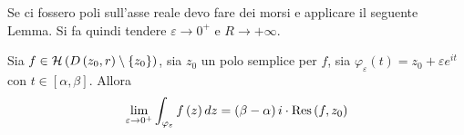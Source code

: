 Se ci fossero poli sull'asse reale devo fare dei morsi e applicare il seguente Lemma. Si fa quindi tendere $\varepsilon \rightarrow 0^{ + }$ e $R\rightarrow + \infty $.
\begin{thm}
 Sia $f\in \Hc \left(D\left(z_{0} ,r\right) \setminus \left\{z_{0}\right\}\right)$, sia $z_{0}$ un polo semplice per $f$, sia $\varphi _{\varepsilon }\left(t\right) = z_{0} + \varepsilon e^{it}$ con $t\in \left[ \alpha ,\beta \right]$. Allora
\begin{equation*}
\lim _{\varepsilon \rightarrow 0^{ + }}\int _{\varphi _{\varepsilon }} f\left(z\right) dz = \left(\beta - \alpha \right) i\cdot \Res \left(f,z_{0}\right)
\end{equation*}
\end{thm}
\begin{figure}[htpb]
	\centering
{} %

\begin{tikzpicture}[x = 0.75pt,y = 0.75pt,yscale = -1,xscale = 1]


\end{tikzpicture}
\end{figure}
